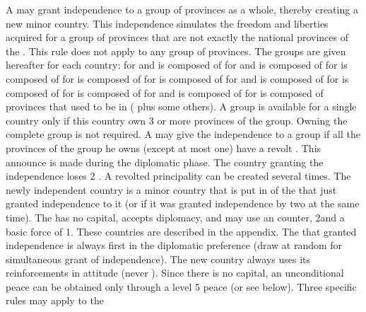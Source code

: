 \aparag A \MAJ may grant independence to a group of provinces as a whole,
thereby creating a new minor country. This independence simulates the freedom
and liberties acquired for a group of provinces that are not exactly the
national provinces of the \MAJ.
\aparag This rule does not apply to any group of provinces. The groups are
given hereafter for each country:
\bparag {} for \SPA and \AUS is composed of
\bparag {} for \SUE and \RUS is composed of
\bparag {} for \ANG is composed of
\bparag {} for \SPA is composed of
\bparag {} for \SUE is composed of
\bparag {} for \POL and \RUS is composed of
\bparag {} for \SUE is composed of
\bparag {} for \SUE is composed of
\bparag {} for \POL and \RUS is composed of
\bparag {} for \PRU is composed of provinces that used to be
in \POL ( plus some others).
\bparag A group is available for a single country only if this country own 3
or more provinces of the group. Owning the complete group is not required.
 A \MAJ may give the independence to a group
if all the provinces of the group he owns (except at most one) have a revolt
\facemoins. This announce is made during the diplomatic phase.
\bparag The country granting the independence loses 2 \STAB.
\bparag A revolted principality can be created several times.
 The newly independent country is a minor country that
is put in \RM of the \MAJ that just granted independence to it (or \Neutral if
it was granted independence by two \MAJ at the same time).
\bparag The \MIN has no capital, accepts diplomacy, and may use an \ARMY
counter, 2\LD and a basic force of 1\ARMY\facemoins. These countries are
described in the appendix. The \MAJ that granted independence is always first
in the diplomatic preference (draw at random for simultaneous grant of
independence).
\bparag The new country always uses its reinforcements in 
attitude (never ). Since there is no capital, an
unconditional peace can be obtained only through a level 5 peace (or see
below).
 Three specific rules may apply to the
